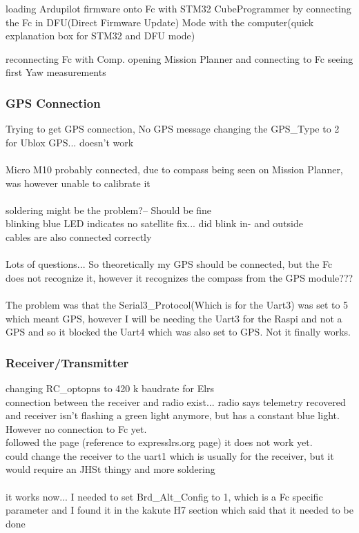 \documentclass{article}
\begin{document}
	loading Ardupilot firmware onto Fc with STM32 CubeProgrammer by connecting the Fc in DFU(Direct Firmware Update) Mode with the computer(quick explanation box for STM32 and DFU mode)
	
	reconnecting Fc with Comp. 
	opening Mission Planner and connecting to Fc seeing first Yaw measurements 
	\subsubsection{GPS Connection}
	
	Trying to get GPS connection, No GPS message
	changing the GPS\_Type to 2 for Ublox GPS... doesn't work
	\\
	\\ Micro M10 probably connected, due to compass being seen on Mission Planner, was however unable to calibrate it
	\\
	\\ soldering might be the problem?-- Should be fine
	\\ blinking blue LED indicates no satellite fix... did blink in- and outside
	\\ cables are also connected correctly
	\\
	\\ Lots of questions... So theoretically my GPS should be connected, but the Fc does not recognize it, however it recognizes the compass from the GPS module???
	\\
	\\ The problem was that the Serial3\_Protocol(Which is for the Uart3) was set to 5 which meant GPS, however I will be needing the Uart3 for the Raspi and not a GPS and so it blocked the Uart4 which was also set to GPS. Not it finally works.
	\subsubsection{Receiver/Transmitter}
	changing RC\_optopns to 420 k baudrate for Elrs
	\\ connection between the receiver and radio exist... radio says telemetry recovered and receiver isn't flashing a green light anymore, but has a constant blue light. However no connection to Fc yet.
	\\ followed the page (reference to expresslrs.org page) it does not work yet. 
	\\ could change the receiver to the uart1 which is usually for the receiver, but it would require an JHSt thingy and more soldering
	\\
	\\ it works now... I needed to set Brd\_Alt\_Config to 1, which is a Fc specific parameter and I found it in the kakute H7 section which said that it needed to be done
\end{document}
